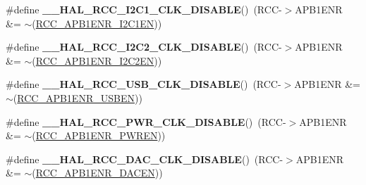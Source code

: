 \begin{DoxyCompactItemize}
\item 
\hypertarget{group___r_c_c___a_p_b1___clock___enable___disable_ga490a853eae72da96aad5379a6e939dd8}{\#define {\bfseries \-\_\-\-\_\-\-H\-A\-L\-\_\-\-R\-C\-C\-\_\-\-I2\-C1\-\_\-\-C\-L\-K\-\_\-\-D\-I\-S\-A\-B\-L\-E}()~(R\-C\-C-\/$>$A\-P\-B1\-E\-N\-R \&= $\sim$(\hyperlink{group___peripheral___registers___bits___definition_ga5ca3afe0c517702b2d1366b692c8db0e}{R\-C\-C\-\_\-\-A\-P\-B1\-E\-N\-R\-\_\-\-I2\-C1\-E\-N}))}\label{group___r_c_c___a_p_b1___clock___enable___disable_ga490a853eae72da96aad5379a6e939dd8}

\item 
\hypertarget{group___r_c_c___a_p_b1___clock___enable___disable_ga3ebc5988bcf1e2965ed482fd76c67b22}{\#define {\bfseries \-\_\-\-\_\-\-H\-A\-L\-\_\-\-R\-C\-C\-\_\-\-I2\-C2\-\_\-\-C\-L\-K\-\_\-\-D\-I\-S\-A\-B\-L\-E}()~(R\-C\-C-\/$>$A\-P\-B1\-E\-N\-R \&= $\sim$(\hyperlink{group___peripheral___registers___bits___definition_gafd7d1c3c7dbe20aea87a694ae15840f6}{R\-C\-C\-\_\-\-A\-P\-B1\-E\-N\-R\-\_\-\-I2\-C2\-E\-N}))}\label{group___r_c_c___a_p_b1___clock___enable___disable_ga3ebc5988bcf1e2965ed482fd76c67b22}

\item 
\hypertarget{group___r_c_c___a_p_b1___clock___enable___disable_ga248a0f9f8b79b169d2e5ba5bd87b03c7}{\#define {\bfseries \-\_\-\-\_\-\-H\-A\-L\-\_\-\-R\-C\-C\-\_\-\-U\-S\-B\-\_\-\-C\-L\-K\-\_\-\-D\-I\-S\-A\-B\-L\-E}()~(R\-C\-C-\/$>$A\-P\-B1\-E\-N\-R \&= $\sim$(\hyperlink{group___peripheral___registers___bits___definition_ga563ec3f13e60adc91bc8741c5cc8184f}{R\-C\-C\-\_\-\-A\-P\-B1\-E\-N\-R\-\_\-\-U\-S\-B\-E\-N}))}\label{group___r_c_c___a_p_b1___clock___enable___disable_ga248a0f9f8b79b169d2e5ba5bd87b03c7}

\item 
\hypertarget{group___r_c_c___a_p_b1___clock___enable___disable_gaf3db86d2db2bad45732a742b6a91ea0b}{\#define {\bfseries \-\_\-\-\_\-\-H\-A\-L\-\_\-\-R\-C\-C\-\_\-\-P\-W\-R\-\_\-\-C\-L\-K\-\_\-\-D\-I\-S\-A\-B\-L\-E}()~(R\-C\-C-\/$>$A\-P\-B1\-E\-N\-R \&= $\sim$(\hyperlink{group___peripheral___registers___bits___definition_ga5c19997ccd28464b80a7c3325da0ca60}{R\-C\-C\-\_\-\-A\-P\-B1\-E\-N\-R\-\_\-\-P\-W\-R\-E\-N}))}\label{group___r_c_c___a_p_b1___clock___enable___disable_gaf3db86d2db2bad45732a742b6a91ea0b}

\item 
\hypertarget{group___r_c_c___a_p_b1___clock___enable___disable_ga6817d8397756e235e5d29e980c7dbb47}{\#define {\bfseries \-\_\-\-\_\-\-H\-A\-L\-\_\-\-R\-C\-C\-\_\-\-D\-A\-C\-\_\-\-C\-L\-K\-\_\-\-D\-I\-S\-A\-B\-L\-E}()~(R\-C\-C-\/$>$A\-P\-B1\-E\-N\-R \&= $\sim$(\hyperlink{group___peripheral___registers___bits___definition_ga087968e2786321fb8645c46b22eea132}{R\-C\-C\-\_\-\-A\-P\-B1\-E\-N\-R\-\_\-\-D\-A\-C\-E\-N}))}\label{group___r_c_c___a_p_b1___clock___enable___disable_ga6817d8397756e235e5d29e980c7dbb47}


\end{DoxyCompactItemize}
